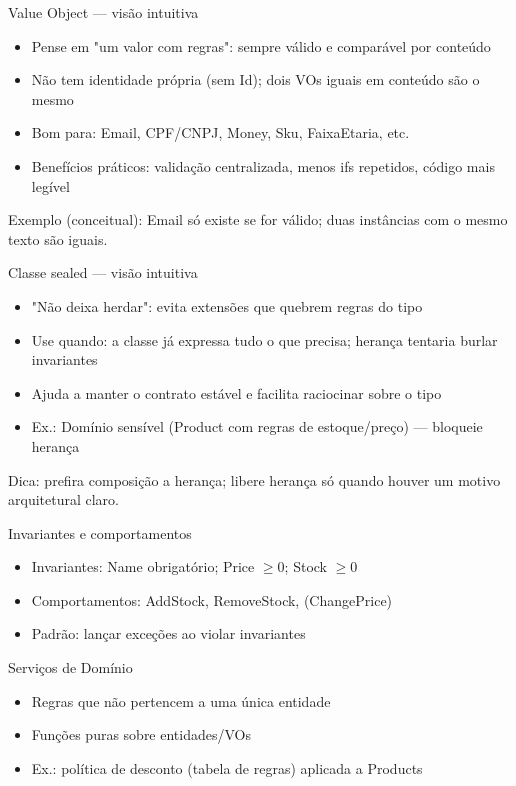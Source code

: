 \documentclass{beamer}
\begin{document}
\begin{frame}{Value Object — visão intuitiva}
\begin{itemize}
  \item Pense em "um valor com regras": sempre válido e comparável por conteúdo
  \item Não tem identidade própria (sem Id); dois VOs iguais em conteúdo são o mesmo
  \item Bom para: Email, CPF/CNPJ, Money, Sku, FaixaEtaria, etc.
  \item Benefícios práticos: validação centralizada, menos ifs repetidos, código mais legível
\end{itemize}
Exemplo (conceitual): Email só existe se for válido; duas instâncias com o mesmo texto são iguais.
\end{frame}

\begin{frame}{Classe sealed — visão intuitiva}
\begin{itemize}
  \item "Não deixa herdar": evita extensões que quebrem regras do tipo
  \item Use quando: a classe já expressa tudo o que precisa; herança tentaria burlar invariantes
  \item Ajuda a manter o contrato estável e facilita raciocinar sobre o tipo
  \item Ex.: Domínio sensível (Product com regras de estoque/preço) — bloqueie herança
\end{itemize}
Dica: prefira composição a herança; libere herança só quando houver um motivo arquitetural claro.
\end{frame}

\begin{frame}{Invariantes e comportamentos}
\begin{itemize}
  \item Invariantes: Name obrigatório; Price $\ge 0$; Stock $\ge 0$
  \item Comportamentos: AddStock, RemoveStock, (ChangePrice)
  \item Padrão: lançar exceções ao violar invariantes
\end{itemize}
\end{frame}

\begin{frame}{Serviços de Domínio}
\begin{itemize}
  \item Regras que não pertencem a uma única entidade
  \item Funções puras sobre entidades/VOs
  \item Ex.: política de desconto (tabela de regras) aplicada a Products
\end{itemize}
\end{frame}
\end{document}
